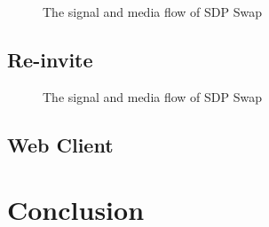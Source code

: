 \begin{figure}[!hbtp]
\centering
{}
\caption{The signal and media flow of SDP Swap}
\label{fig:SdpSwap}
\end{figure}

\subsection{Re-invite}
\label{sec:Solution:ThirdPartyCall:Re-invite}

\begin{figure}[!hbtp]
\centering
{}
\caption{The signal and media flow of SDP Swap}
\label{fig:Re-invite}
\end{figure}

\subsection{Web Client}
\label{sec:Solution:ThirdPartyCall:WebClient}


\section{Conclusion}
\label{sec:Solution:Conclusion}




